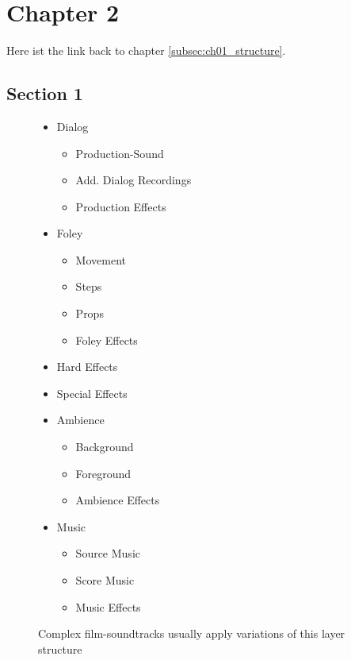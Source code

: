 \chapter{Chapter 2}
\label{ch:chapter2}

Here ist the link back to chapter \ref{subsec:ch01_structure}.

\section{Section 1}
\label{sec:ch02_section01}

\begin{wrapfigure}{R}{0.5\textwidth}
\begin{minipage}[l][][l]{0.45\textwidth}
\vspace{-10pt}
\begin{itemize}
  \item Dialog 
  \begin{itemize}
	  \item Production-Sound 
	  \item Add. Dialog Recordings
	  \item Production Effects 
  \end{itemize}
  \item Foley
  \begin{itemize}
	  \item Movement
	  \item Steps
	  \item Props
	  \item Foley Effects
  \end{itemize}
  \item Hard Effects 
  \item Special Effects 
  \item Ambience 
  \begin{itemize}
  	\item Background
  	\item Foreground
  	\item Ambience Effects
  \end{itemize}
  \item Music
  \begin{itemize}
    \item Source Music
    \item Score Music
    \item Music Effects
  \end{itemize}
\end{itemize}%
\vspace{5pt}
\end{minipage}
\captionsetup{width=0.85\linewidth}
\caption[Layers of Film Sound]{Complex film-soundtracks usually apply variations of this layer structure
}
\vspace{-30pt}
\end{wrapfigure}

